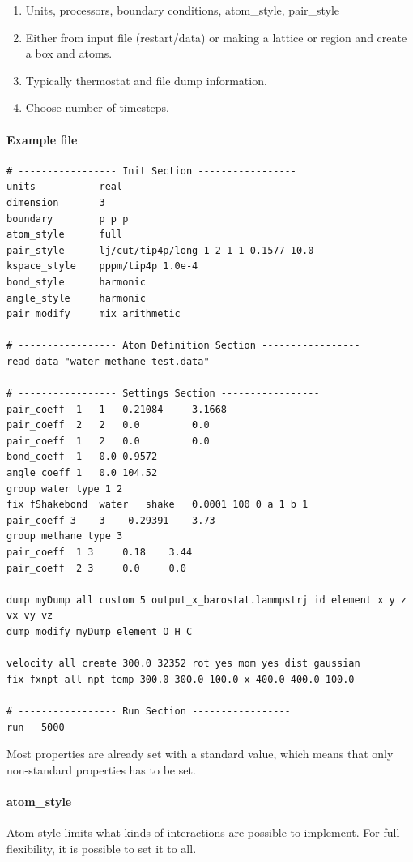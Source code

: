 \begin{enumerate}
\item {} Units, processors, boundary conditions, atom\_style, pair\_style
\item {} Either from input file (restart/data) or making a lattice or region and create a box and atoms. 
\item {} Typically thermostat and file dump information.
\item {} Choose number of timesteps.
\end{enumerate}
\paragraph{Example file}

\begin{lstlisting}[language=LammpsInput]
# ----------------- Init Section -----------------
units 			real
dimension 		3
boundary		p p p 
atom_style		full
pair_style		lj/cut/tip4p/long 1 2 1 1 0.1577 10.0
kspace_style	pppm/tip4p 1.0e-4
bond_style 		harmonic
angle_style		harmonic
pair_modify		mix arithmetic

# ----------------- Atom Definition Section -----------------
read_data "water_methane_test.data"

# ----------------- Settings Section -----------------
pair_coeff	1 	1 	0.21084 	3.1668
pair_coeff	2 	2	0.0 		0.0
pair_coeff	1 	2 	0.0 		0.0
bond_coeff  1 	0.0 0.9572
angle_coeff 1 	0.0 104.52
group water type 1 2
fix	fShakebond	water 	shake 	0.0001 100 0 a 1 b 1
pair_coeff 3 	3 	 0.29391 	3.73
group methane type 3
pair_coeff 	1 3 	0.18 	3.44
pair_coeff 	2 3 	0.0 	0.0

dump myDump all custom 5 output_x_barostat.lammpstrj id element x y z vx vy vz
dump_modify myDump element O H C

velocity all create 300.0 32352 rot yes mom yes dist gaussian
fix fxnpt all npt temp 300.0 300.0 100.0 x 400.0 400.0 100.0

# ----------------- Run Section -----------------
run   5000
\end{lstlisting}

Most properties are already set with a standard value, which means that only non-standard properties has to be set. 

\paragraph{atom\_style}
Atom style limits what kinds of interactions are possible to implement. For full flexibility, it is possible to set it to all.

